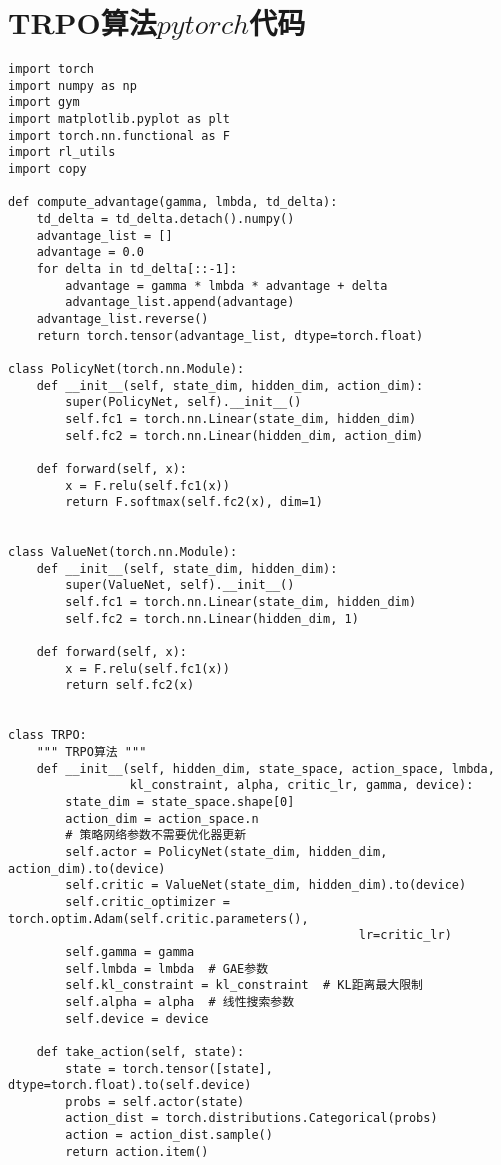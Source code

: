 \section{TRPO算法$pytorch$代码}
\begin{lstlisting}
import torch
import numpy as np
import gym
import matplotlib.pyplot as plt
import torch.nn.functional as F
import rl_utils
import copy

def compute_advantage(gamma, lmbda, td_delta):
    td_delta = td_delta.detach().numpy()
    advantage_list = []
    advantage = 0.0
    for delta in td_delta[::-1]:
        advantage = gamma * lmbda * advantage + delta
        advantage_list.append(advantage)
    advantage_list.reverse()
    return torch.tensor(advantage_list, dtype=torch.float)

class PolicyNet(torch.nn.Module):
    def __init__(self, state_dim, hidden_dim, action_dim):
        super(PolicyNet, self).__init__()
        self.fc1 = torch.nn.Linear(state_dim, hidden_dim)
        self.fc2 = torch.nn.Linear(hidden_dim, action_dim)

    def forward(self, x):
        x = F.relu(self.fc1(x))
        return F.softmax(self.fc2(x), dim=1)


class ValueNet(torch.nn.Module):
    def __init__(self, state_dim, hidden_dim):
        super(ValueNet, self).__init__()
        self.fc1 = torch.nn.Linear(state_dim, hidden_dim)
        self.fc2 = torch.nn.Linear(hidden_dim, 1)

    def forward(self, x):
        x = F.relu(self.fc1(x))
        return self.fc2(x)


class TRPO:
    """ TRPO算法 """
    def __init__(self, hidden_dim, state_space, action_space, lmbda,
                 kl_constraint, alpha, critic_lr, gamma, device):
        state_dim = state_space.shape[0]
        action_dim = action_space.n
        # 策略网络参数不需要优化器更新
        self.actor = PolicyNet(state_dim, hidden_dim, action_dim).to(device)
        self.critic = ValueNet(state_dim, hidden_dim).to(device)
        self.critic_optimizer = torch.optim.Adam(self.critic.parameters(),
                                                 lr=critic_lr)
        self.gamma = gamma
        self.lmbda = lmbda  # GAE参数
        self.kl_constraint = kl_constraint  # KL距离最大限制
        self.alpha = alpha  # 线性搜索参数
        self.device = device

    def take_action(self, state):
        state = torch.tensor([state], dtype=torch.float).to(self.device)
        probs = self.actor(state)
        action_dist = torch.distributions.Categorical(probs)
        action = action_dist.sample()
        return action.item()


\end{lstlisting}
